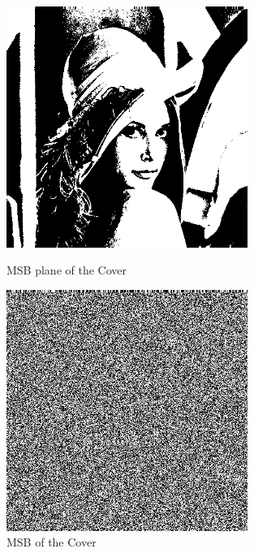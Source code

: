 \documentclass{report}
\begin{document}
\begin{figure}[H]
\centering
\begin{minipage}{0.46\linewidth}
\centering
\includegraphics[width=0.7\textwidth]{images/covermsb.png}
\caption{MSB plane of the Cover}
\end{minipage}
\hfill
\begin{minipage}{0.46\linewidth}
\centering
\includegraphics[width=0.7\textwidth]{images/coverlsb.png}
\caption{MSB of the Cover}
\end{minipage}
\end{figure}
\end{document}
